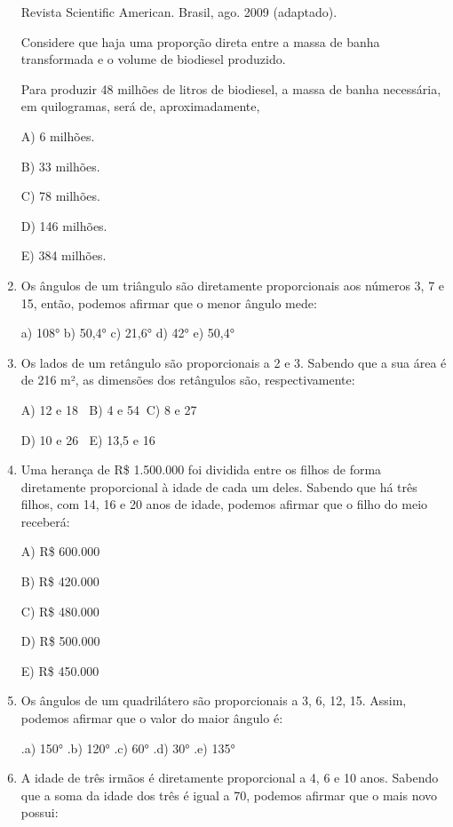 \begin{multicols*}{2}
\begin{enumerate}
		      Revista Scientific American. Brasil, ago. 2009 (adaptado).

		      Considere que haja uma proporção direta entre a massa de banha transformada e o volume de biodiesel produzido.

		      Para produzir 48 milhões de litros de biodiesel, a massa de banha necessária, em quilogramas, será de, aproximadamente,

		      A) 6 milhões.

		      B) 33 milhões.

		      C) 78 milhões.

		      D) 146 milhões.

		      E) 384 milhões.

		\item Os ângulos de um triângulo são diretamente proporcionais aos números 3, 7 e 15, então, podemos afirmar que o menor ângulo mede:

		      a) 108°  b) 50,4°  c) 21,6°  d) 42°  e) 50,4°

		\item Os lados de um retângulo são proporcionais a 2 e 3. Sabendo que a sua área é de 216 m², as dimensões dos retângulos são, respectivamente:

		      A) 12 e 18 $ \ $ B) 4 e 54$ \ $ C) 8 e 27

		      D) 10 e 26 $ \ $ E) 13,5 e 16

		\item Uma herança de R\$ 1.500.000 foi dividida entre os filhos de forma diretamente proporcional à idade de cada um deles. Sabendo que há três filhos, com 14, 16 e 20 anos de idade, podemos afirmar que o filho do meio receberá:

		      A) R\$ 600.000

		      B) R\$ 420.000

		      C) R\$ 480.000

		      D) R\$ 500.000

		      E) R\$ 450.000

		\item Os ângulos de um quadrilátero são proporcionais a 3, 6, 12, 15. Assim, podemos afirmar que o valor do maior ângulo é:

		      .a) 150°  .b) 120°  .c) 60°  .d) 30°  .e) 135°

		\item A idade de três irmãos é diretamente proporcional a 4, 6 e 10 anos. Sabendo que a soma da idade dos três é igual a 70, podemos afirmar que o mais novo possui:


\end{enumerate}
\end{multicols*}
